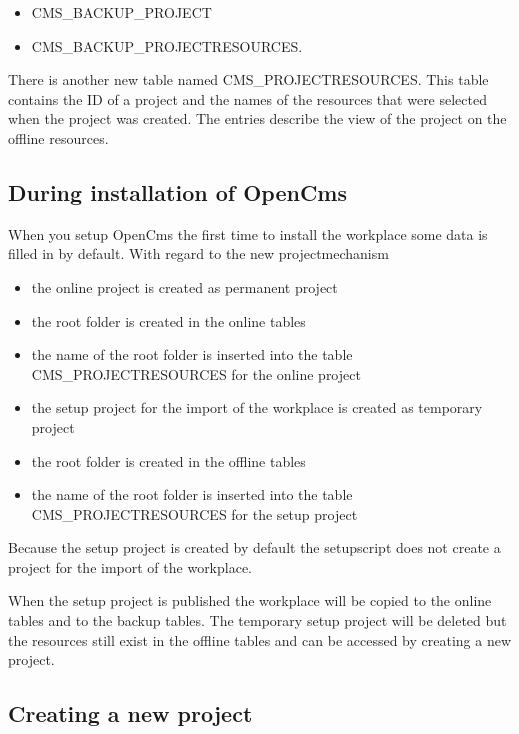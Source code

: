\begin{itemize}
\item CMS\_BACKUP\_PROJECT
\item CMS\_BACKUP\_PROJECTRESOURCES.
\end{itemize}

There is another new table named CMS\_PROJECTRESOURCES. This table
contains the ID of a project and the names of the resources that
were selected when the project was created. The entries describe
the view of the project on the offline resources.

\subsection{During installation of OpenCms}

When you setup OpenCms the first time to install the workplace
some data is filled in by default. With regard to the new
projectmechanism

\begin{itemize}
\item the online project is created as permanent project
\item the root folder is created in the online tables
\item the name of the root folder is inserted into the table CMS\_PROJECTRESOURCES for the online project
\item the setup project for the import of the workplace is created as temporary project
\item the root folder is created in the offline tables
\item the name of the root folder is inserted into the table CMS\_PROJECTRESOURCES for the setup project
\end{itemize}

Because the setup project is created by default the setupscript
does not create a project for the import of the workplace.

When the setup project is published the workplace will be copied
to the online tables and to the backup tables. The temporary setup
project will be deleted but the resources still exist in the
offline tables and can be accessed by creating a new project.

\subsection{Creating a new project}

